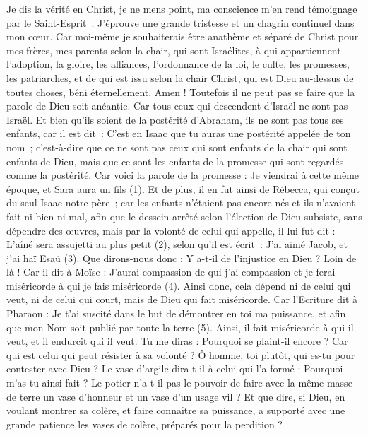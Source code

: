 \begin{multicols}{2}
\VerseOne{}Je dis la vérité en Christ, je ne mens point, ma conscience m’en rend témoignage par le Saint-Esprit :
J’éprouve une grande tristesse et un chagrin continuel dans mon cœur.
Car moi-même je souhaiterais être anathème et séparé de Christ pour mes frères, mes parents selon la chair,
qui sont Israélites, à qui appartiennent l'adoption, la gloire, les alliances, l'ordonnance de la loi, le culte,
les promesses, les patriarches, et de qui est issu selon la chair Christ, qui est Dieu au-dessus de toutes choses, béni éternellement, Amen !
Toutefois il ne peut pas se faire que la parole de Dieu soit anéantie. Car tous ceux qui descendent d’Israël ne sont pas Israël.
Et bien qu’ils soient de la postérité d'Abraham, ils ne sont pas tous ses enfants, car il est dit : C'est en Isaac que tu auras une postérité appelée de ton nom ;
c'est-à-dire que ce ne sont pas ceux qui sont enfants de la chair qui sont enfants de Dieu, mais que ce sont les enfants de la promesse qui sont regardés comme la postérité.
Car voici la parole de la promesse : Je viendrai à cette même époque, et Sara aura un fils (1).
Et de plus, il en fut ainsi de Rébecca, qui conçut du seul Isaac notre père ;
car les enfants n’étaient pas encore nés et ils n’avaient fait ni bien ni mal, afin que le dessein arrêté selon l'élection de Dieu subsiste, sans dépendre des œuvres, mais par la volonté de celui qui appelle,
il lui fut dit : L’aîné sera assujetti au plus petit (2), selon qu’il est écrit :
J'ai aimé Jacob, et j'ai haï Esaü (3).
Que dirons-nous donc : Y a-t-il de l’injustice en Dieu ? Loin de là !
Car il dit à Moïse : J'aurai compassion de qui j’ai compassion et je ferai miséricorde à qui je fais miséricorde (4).
Ainsi donc, cela dépend ni de celui qui veut, ni de celui qui court, mais de Dieu qui fait miséricorde.
Car l'Ecriture dit à Pharaon : Je t'ai suscité dans le but de démontrer en toi ma puissance, et afin que mon Nom soit publié par toute la terre (5).
Ainsi, il fait miséricorde à qui il veut, et il endurcit qui il veut.
Tu me diras : Pourquoi se plaint-il encore ? Car qui est celui qui peut résister à sa volonté ?
Ô homme, toi plutôt, qui es-tu pour contester avec Dieu ? Le vase d’argile dira-t-il à celui qui l'a formé : Pourquoi m'as-tu ainsi fait ?
Le potier n'a-t-il pas le pouvoir de faire avec la même masse de terre un vase d’honneur et un vase d’un usage vil ?
Et que dire, si Dieu, en voulant montrer sa colère, et faire connaître sa puissance, a supporté avec une grande patience les vases de colère, préparés pour la perdition ?

\end{multicols}
